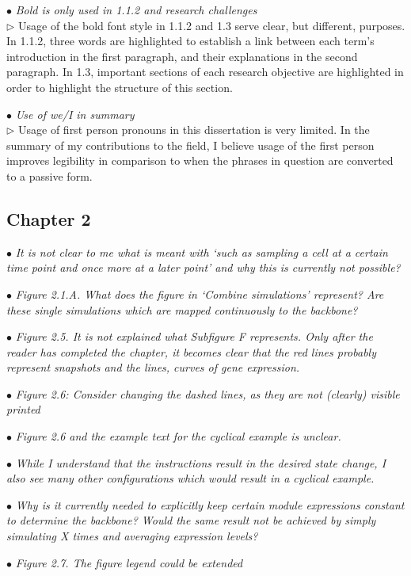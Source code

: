 \documentclass[10pt]{article}
\newcommand{\exam}[2][\  ]{\hspace{0pt}\marginpar{\color{red}#1}$\bullet$ \textit{#2}}
\newcommand{\answ}[1]{{\color{blue} $\triangleright$ #1}}
\begin{document}
{\exam{Bold is only used in 1.1.2 and research challenges} \\
\answ{Usage of the bold font style in 1.1.2 and 1.3 serve clear, but different, purposes. In 1.1.2, three words are highlighted to establish a link between each term's introduction in the first paragraph, and their explanations in the second paragraph. In 1.3, important sections of each research objective are highlighted in order to highlight the structure of this section.}

\exam{Use of we/I in summary} \\
\answ{Usage of first person pronouns in this dissertation is very limited. In the summary of my contributions to the field, I believe usage of the first person improves legibility in comparison to when the phrases in question are converted to a passive form.}



\subsection{Chapter 2}

\exam{It is not clear to me what is meant with ‘such as sampling a cell at a certain
	time point and once more at a later point’ and why this is currently not
	possible?}

\exam{Figure 2.1.A. What does the figure in ‘Combine simulations’ represent? Are
		these single simulations which are mapped continuously to the backbone?}

\exam{Figure 2.5. It is not explained what Subfigure F represents. Only after the
	reader has completed the chapter, it becomes clear that the red lines probably
	represent snapshots and the lines, curves of gene expression.}

\exam{Figure 2.6: Consider changing the dashed lines, as they are not (clearly)
		visible printed}
	
\exam{Figure 2.6 and the example text for the cyclical example is unclear.}

\exam{While I
		understand that the instructions result in the desired state change, I also see
		many other configurations which would result in a cyclical example.}
	
\exam{Why is it currently needed to explicitly keep certain module expressions constant to
		determine the backbone? Would the same result not be achieved by simply
		simulating X times and averaging expression levels?}

\exam{Figure 2.7. The figure legend could be extended}

}
\end{document}
